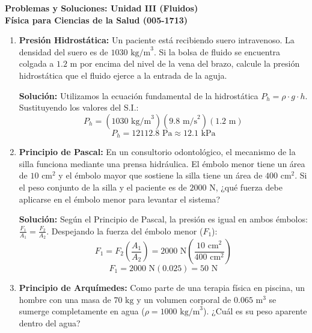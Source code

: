 \documentclass[12pt,letterpaper]{article}
\begin{document}
\begin{center}
    \textbf{\Large Problemas y Soluciones: Unidad III (Fluidos)}\\
    \vspace{0.2cm}
    \textbf{Física para Ciencias de la Salud (005-1713)}\\
\end{center}

\vspace{0.5cm}

\begin{enumerate}

    \item \textbf{Presión Hidrostática:} Un paciente está recibiendo suero intravenoso. La densidad del suero es de $1030 \text{ kg/m}^3$. Si la bolsa de fluido se encuentra colgada a $1.2 \text{ m}$ por encima del nivel de la vena del brazo, calcule la presión hidrostática que el fluido ejerce a la entrada de la aguja.
    
    \textbf{Solución:}
    Utilizamos la ecuación fundamental de la hidrostática $P_h = \rho \cdot g \cdot h$.
    Sustituyendo los valores del S.I.:
    \[
    P_h = (1030 \text{ kg/m}^3)(9.8 \text{ m/s}^2)(1.2 \text{ m})
    \]
    \[
    P_h = 12112.8 \text{ Pa} \approx 12.1 \text{ kPa}
    \]

    \vspace{0.3cm}
    \item \textbf{Principio de Pascal:} En un consultorio odontológico, el mecanismo de la silla funciona mediante una prensa hidráulica. El émbolo menor tiene un área de $10 \text{ cm}^2$ y el émbolo mayor que sostiene la silla tiene un área de $400 \text{ cm}^2$. Si el peso conjunto de la silla y el paciente es de $2000 \text{ N}$, ¿qué fuerza debe aplicarse en el émbolo menor para levantar el sistema?

    \textbf{Solución:}
    Según el Principio de Pascal, la presión es igual en ambos émbolos: $\frac{F_1}{A_1} = \frac{F_2}{A_2}$.
    Despejando la fuerza del émbolo menor ($F_1$):
    \[
    F_1 = F_2 \left( \frac{A_1}{A_2} \right) = 2000 \text{ N} \left( \frac{10 \text{ cm}^2}{400 \text{ cm}^2} \right)
    \]
    \[
    F_1 = 2000 \text{ N} (0.025) = 50 \text{ N}
    \]

    \vspace{0.3cm}
    \item \textbf{Principio de Arquímedes:} Como parte de una terapia física en piscina, un hombre con una masa de $70 \text{ kg}$ y un volumen corporal de $0.065 \text{ m}^3$ se sumerge completamente en agua ($\rho = 1000 \text{ kg/m}^3$). ¿Cuál es su peso aparente dentro del agua?


\end{enumerate}
\end{document}
